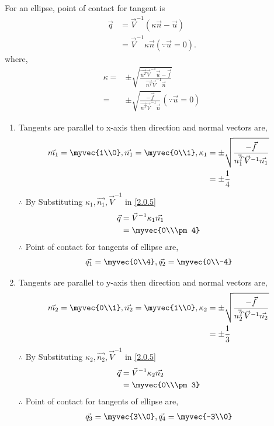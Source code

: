 \documentclass[journal,12pt,twocolumn]{IEEEtran}
\begin{document}
For an ellipse, point of contact for tangent is
\begin{align}
\vec{q}&=\vec{V}^{-1}(\kappa\vec{n}-\vec{u})\\
&=\vec{V}^{-1}\kappa\vec{n}     (\because \vec{u}=0). \label{2.0.5}
\end{align}
where,
\begin{align}
\kappa=&\pm \sqrt{\frac{\vec{u^T}\vec{V}^{-1}\vec{u}-\vec{f}}{\vec{n^T}\vec{V}^{-1}\vec{n}}}\\
      =&\pm \sqrt{\frac{-\vec{f}}{\vec{n^T}\vec{V}^{-1}\vec{n}}}\label{2.0.7}(\because \vec{u}=0)
\end{align}
\begin{enumerate}
\item Tangents are parallel to x-axis then direction and normal vectors are,
\begin{align}
\vec{m_1} = \myvec{1\\0},\vec{n_1} = \myvec{0\\1},
\kappa_1 &=\pm \sqrt{\frac{-\vec{f}}{\vec{n_1^T}\vec{V}^{-1}\vec{n_1}}} \\
 &=\pm\frac{1}{4}
\end{align}
$\therefore$ By Substituting $\kappa_1,\vec{n_1},\vec{V}^{-1}$ in \eqref{2.0.5}
\begin{align}
\vec{q}&=\vec{V}^{-1}\kappa_1\vec{n_1} \\
&=\myvec{0\\\pm4}
\end{align}
$\therefore$ Point of contact for tangents of ellipse are,
\begin{align}
  \vec{q_1}=\myvec{0\\4},\vec{q_2}=\myvec{0\\-4}
\end{align}
\item Tangents are parallel to y-axis then direction and normal vectors are,
\begin{align}
\vec{m_2} = \myvec{0\\1},\vec{n_2} = \myvec{1\\0},
\kappa_2 &=\pm \sqrt{\frac{-\vec{f}}{\vec{n_2^T}\vec{V}^{-1}\vec{n_2}}} \\
 &=\pm\frac{1}{3}
\end{align}
$\therefore$ By Substituting $\kappa_2,\vec{n_2},\vec{V}^{-1}$ in \eqref{2.0.5}
\begin{align}
\vec{q}&=\vec{V}^{-1}\kappa_2\vec{n_2} \\
&=\myvec{0\\\pm3}
\end{align}
$\therefore$ Point of contact for tangents of ellipse are,
\begin{align}
  \vec{q_3}=\myvec{3\\0},\vec{q_4}=\myvec{-3\\0}
\end{align}
\end{enumerate}
\end{document}
